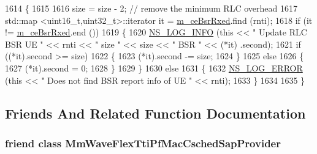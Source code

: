 \begin{DoxyCode}
1614 \{
1615 
1616   size = size - 2; \textcolor{comment}{// remove the minimum RLC overhead}
1617   std::map <uint16\_t,uint32\_t>::iterator it = \hyperlink{classns3_1_1MmWaveFlexTtiPfMacScheduler_acc3a35569b9506219629a0cbc7a53e44}{m\_ceBsrRxed}.find (rnti);
1618   \textcolor{keywordflow}{if} (it != \hyperlink{classns3_1_1MmWaveFlexTtiPfMacScheduler_acc3a35569b9506219629a0cbc7a53e44}{m\_ceBsrRxed}.end ())
1619     \{
1620       \hyperlink{group__logging_gafbd73ee2cf9f26b319f49086d8e860fb}{NS\_LOG\_INFO} (\textcolor{keyword}{this} << \textcolor{stringliteral}{" Update RLC BSR UE "} << rnti << \textcolor{stringliteral}{" size "} << size << \textcolor{stringliteral}{" BSR "} << (*it)
      .second);
1621       \textcolor{keywordflow}{if} ((*it).second >= size)
1622         \{
1623           (*it).second -= size;
1624         \}
1625       \textcolor{keywordflow}{else}
1626         \{
1627           (*it).second = 0;
1628         \}
1629     \}
1630   \textcolor{keywordflow}{else}
1631     \{
1632       \hyperlink{group__logging_ga0261a8db1d4ac5f79417d117634fd455}{NS\_LOG\_ERROR} (\textcolor{keyword}{this} << \textcolor{stringliteral}{" Does not find BSR report info of UE "} << rnti);
1633     \}
1634 
1635 \}
\end{DoxyCode}


\subsection{Friends And Related Function Documentation}
\subsubsection[{\texorpdfstring{Mm\+Wave\+Flex\+Tti\+Pf\+Mac\+Csched\+Sap\+Provider}{MmWaveFlexTtiPfMacCschedSapProvider}}]{\setlength{\rightskip}{0pt plus 5cm}friend class {\bf Mm\+Wave\+Flex\+Tti\+Pf\+Mac\+Csched\+Sap\+Provider}\hspace{0.3cm}{\ttfamily [friend]}}\hypertarget{classns3_1_1MmWaveFlexTtiPfMacScheduler_a64c51265d48561bfda822a01ffbfab03}{}\label{classns3_1_1MmWaveFlexTtiPfMacScheduler_a64c51265d48561bfda822a01ffbfab03}
